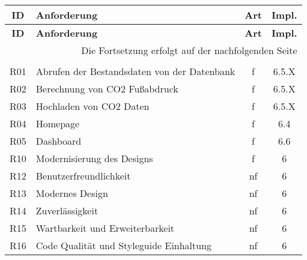 
\begin{longtable}{|c|l|c|c|}

    \hline
    \textbf{ID}          &
    \textbf{Anforderung} &
    \textbf{Art}         &
    \textbf{Impl.}                                                                         \\ \hline
    \endfirsthead

    \hline
    \textbf{ID}          &
    \textbf{Anforderung} &
    \textbf{Art}         &
    \textbf{Impl.}                                                                         \\ \hline
    \endhead

    \hline
    \multicolumn{4}{|r|}{{Die Fortsetzung erfolgt auf der nachfolgenden Seite}}            \\ \hline
    \endfoot

    \endlastfoot

    \multicolumn{4}{|c|}{\textbf{Muss-Anforderungen}}                                      \\ \hline

    R01                  & Abrufen der Bestandsdaten von der Datenbank        & f  & 6.5.X \\ \hline
    R02                  & Berechnung von CO2 Fußabdruck                      & f  & 6.5.X \\ \hline
    R03                  & Hochladen von CO2 Daten                            & f  & 6.5.X \\ \hline
    R04                  & Homepage                                           & f  & 6.4   \\ \hline
    R05                  & Dashboard                                          & f  & 6.6   \\ \hline
    R10                  & Modernisierung des Designs                         & f  & 6     \\ \hline
    R12                  & Benutzerfreundlichkeit                             & nf & 6     \\ \hline
    R13                  & Modernes Design                                    & nf & 6     \\ \hline
    R14                  & Zuverlässigkeit                                    & nf & 6     \\ \hline
    R15                  & Wartbarkeit und Erweiterbarkeit                    & nf & 6     \\ \hline
    R16                  & Code Qualität und Styleguide Einhaltung            & nf & 6     \\ \hline


\end{longtable}
